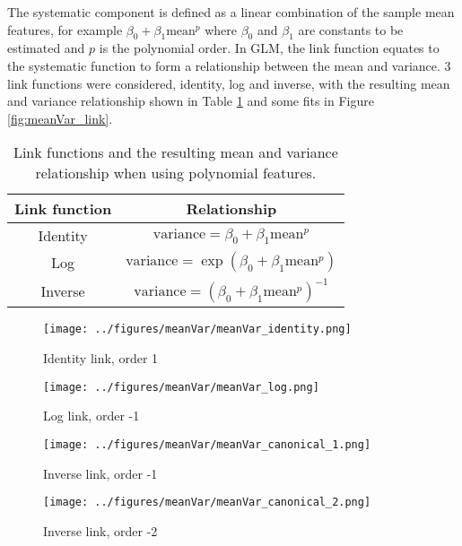 \documentclass[a4paper]{proc}
\begin{document}
The systematic component is defined as a linear combination of the sample mean features, for example $\beta_0+\beta_1\text{mean}^p$ where $\beta_0$ and $\beta_1$ are constants to be estimated and $p$ is the polynomial order. In GLM, the link function equates to the systematic function to form a relationship between the mean and variance. 3 link functions were considered, identity, log and inverse, with the resulting mean and variance relationship shown in Table \ref{table:link_functions} and some fits in Figure \ref{fig:meanVar_link}.

\begin{table}
	\centering
	\begin{tabular}{c|c}
	Link function & Relationship \\
	\hline
	Identity & $\text{variance} = \beta_0+\beta_1\text{mean}^p$ \\
	Log & $\text{variance} = \exp{\left(\beta_0+\beta_1\text{mean}^p\right)}$ \\
	Inverse & $\text{variance} = \left(\beta_0+\beta_1\text{mean}^p\right)^{-1}$
	\end{tabular}
	\caption{Link functions and the resulting mean and variance relationship when using polynomial features.}
	\label{table:link_functions}
\end{table}

\begin{figure*}
	\centering
	\begin{subfigure}{0.45\textwidth}
		\centering
		\texttt{[image: ../figures/meanVar/meanVar\_identity.png]}
		\caption{Identity link, order 1}
	\end{subfigure}
	\begin{subfigure}{0.45\textwidth}
		\centering
		\texttt{[image: ../figures/meanVar/meanVar\_log.png]}
		\caption{Log link, order -1}
	\end{subfigure}
	\begin{subfigure}{0.45\textwidth}
		\centering
		\texttt{[image: ../figures/meanVar/meanVar\_canonical\_1.png]}
		\caption{Inverse link, order -1}
	\end{subfigure}
	\begin{subfigure}{0.45\textwidth}
		\centering
		\texttt{[image: ../figures/meanVar/meanVar\_canonical\_2.png]}
		\caption{Inverse link, order -2}
	\end{subfigure}
	\caption{Shading uncorrected within pixel mean and variance grey value frequency density plot of each pixel in the segmented image of the 3D printed sample. A Gamma GLM was fitted with different link functions and polynomial ordera. The solid and dotted lines are the mean response and the $\Phi(\pm 1)$ quantiles respectively.}
	\label{fig:meanVar_link}
\end{figure*}
\end{document}

